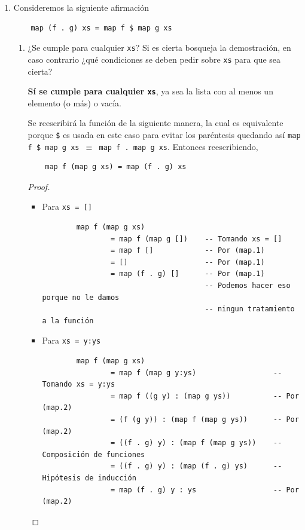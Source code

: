 \documentclass[11pt,letterpaper]{article}
\begin{document}
\begin{enumerate}
\item Consideremos la siguiente afirmación

\begin{verbatim}
    map (f . g) xs = map f $ map g xs
\end{verbatim}

\begin{enumerate}[label=\alph*)]
    
\item ¿Se cumple para cualquier \texttt{xs}? Si es cierta bosqueja la demostración, en caso contrario
¿qué condiciones se deben pedir sobre \texttt{xs} para que sea cierta?

\textcolor{WildStrawberry}{\textbf{Sí se cumple para cualquier \texttt{xs}}, ya sea la lista con
al menos un elemento (o más) o vacía.}

Se reescribirá la función de la siguiente manera, la cual es equivalente porque \texttt{\$} es usada
en este caso para evitar los paréntesis quedando así \texttt{map f \$ map g xs $\equiv$ map f . map g xs}.
Entonces reescribiendo,

\begin{verbatim}
    map f (map g xs) = map (f . g) xs
\end{verbatim}

\begin{proof}
\hfill
\begin{itemize}
    \item Para \texttt{xs = []}
    
    \begin{verbatim}
        map f (map g xs)
                = map f (map g [])    -- Tomando xs = []
                = map f []            -- Por (map.1)
                = []                  -- Por (map.1)
                = map (f . g) []      -- Por (map.1)
                                      -- Podemos hacer eso porque no le damos
                                      -- ningun tratamiento a la función
    \end{verbatim}
    
    
    \item Para \texttt{xs = y:ys}
    
    \begin{verbatim}
        map f (map g xs)
                = map f (map g y:ys)                  -- Tomando xs = y:ys
                = map f ((g y) : (map g ys))          -- Por (map.2)
                = (f (g y)) : (map f (map g ys))      -- Por (map.2)
                = ((f . g) y) : (map f (map g ys))    -- Composición de funciones
                = ((f . g) y) : (map (f . g) ys)      -- Hipótesis de inducción
                = map (f . g) y : ys                  -- Por (map.2)
    \end{verbatim}
\end{itemize}
\end{proof}


\end{enumerate}
\end{enumerate}
\end{document}
